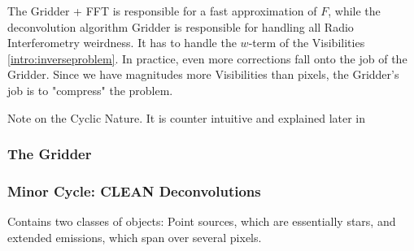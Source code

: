 The Gridder + FFT is responsible for a fast approximation of $F$, while the deconvolution algorithm
Gridder is responsible for handling all Radio Interferometry weirdness. It has to handle the $w$-term of the Visibilities \eqref{intro:inverseproblem}. In practice, even more corrections fall onto the job of the Gridder. Since we have magnitudes more Visibilities than pixels, the Gridder's job is to "compress" the problem.

Note on the Cyclic Nature. It is counter intuitive and explained later in 

\subsubsection{The Gridder}


\subsubsection{Minor Cycle: CLEAN Deconvolutions}
Contains two classes of objects: Point sources, which are essentially stars, and extended emissions, which span over several pixels.


